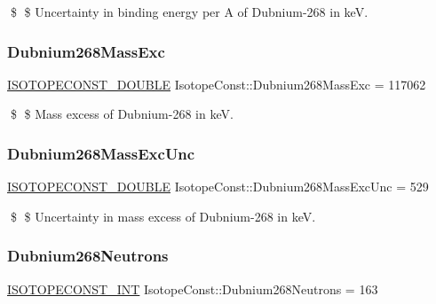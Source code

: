 \$ \$ Uncertainty in binding energy per A of Dubnium-\/268 in keV. \mbox{\label{group___isotope_const-_dubnium-_db268_ga4389e9ccf73b032ad2488ee9b313e788}} 
\subsubsection{\texorpdfstring{Dubnium268\+Mass\+Exc}{Dubnium268MassExc}}
{\footnotesize\ttfamily \mbox{\hyperlink{group___isotope_const-_macros_ga8f45a7272ce02c0b4c65c44636ed719a}{I\+S\+O\+T\+O\+P\+E\+C\+O\+N\+S\+T\+\_\+\+D\+O\+U\+B\+LE}} Isotope\+Const\+::\+Dubnium268\+Mass\+Exc = 117062}

\$ \$ Mass excess of Dubnium-\/268 in keV. \mbox{\label{group___isotope_const-_dubnium-_db268_gac54cd3c57129cd76c2ed2fc50decee45}} 
\subsubsection{\texorpdfstring{Dubnium268\+Mass\+Exc\+Unc}{Dubnium268MassExcUnc}}
{\footnotesize\ttfamily \mbox{\hyperlink{group___isotope_const-_macros_ga8f45a7272ce02c0b4c65c44636ed719a}{I\+S\+O\+T\+O\+P\+E\+C\+O\+N\+S\+T\+\_\+\+D\+O\+U\+B\+LE}} Isotope\+Const\+::\+Dubnium268\+Mass\+Exc\+Unc = 529}

\$ \$ Uncertainty in mass excess of Dubnium-\/268 in keV. \mbox{\label{group___isotope_const-_dubnium-_db268_gae65424addfb75f3a6fe40fcdf55811e5}} 
\subsubsection{\texorpdfstring{Dubnium268\+Neutrons}{Dubnium268Neutrons}}
{\footnotesize\ttfamily \mbox{\hyperlink{group___isotope_const-_macros_ga5f18360b3e99483a35c32d789e62621c}{I\+S\+O\+T\+O\+P\+E\+C\+O\+N\+S\+T\+\_\+\+I\+NT}} Isotope\+Const\+::\+Dubnium268\+Neutrons = 163}


